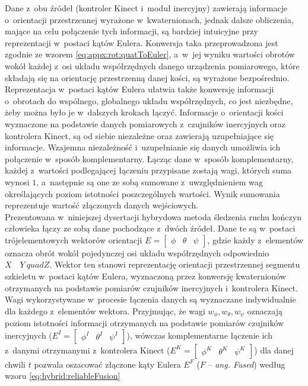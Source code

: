 Dane z~obu źródeł (kontroler Kinect i~moduł inercyjny) zawierają informacje o~orientacji przestrzennej wyrażone w~kwaternionach, jednak dalsze obliczenia, mające na celu połączenie tych informacji, są bardziej intuicyjne przy reprezentacji w~postaci kątów Eulera. Konwersja taka przeprowadzona jest zgodnie ze wzorem \ref{eq:appx:rot:quatToEuler}, a~w~jej wyniku wartości obrotów wokół każdej z~osi układu współrzędnych danego urządzenia pomiarowego, które składają się na orientację przestrzenną danej kości, są wyrażone bezpośrednio. Reprezentacja w~postaci kątów Eulera ułatwia także konwersję informacji o~obrotach do wspólnego, globalnego układu współrzędnych, co jest niezbędne, żeby można było je w~dalszych krokach łączyć. Informacje o~orientacji kości wyznaczone na podstawie danych pomiarowych z~czujników inercyjnych oraz kontrolera Kinect, są od siebie niezależne oraz zawierają uzupełniające się informacje. Wzajemna niezależność i~uzupełnianie się danych umożliwia ich połączenie w~sposób komplementarny. Łącząc dane w~sposób komplementarny, każdej z~wartości podlegającej łączeniu przypisane zostają wagi, których suma wynosi $1$, a~następnie są one ze sobą sumowane z~uwzględnieniem wag określających poziom istotności poszczególnych wartości. Wynik sumowania reprezentuje wartość złączonych danych wejściowych. \\
										
Prezentowana w~niniejszej dysertacji hybrydowa metoda śledzenia ruchu kończyn człowieka łączy ze sobą dane pochodzące z~dwóch źródeł. Dane te są w~postaci trójelementowych wektorów orientacji $E = \begin{bmatrix} \phi &  \theta & \psi \end{bmatrix}$, gdzie każdy z~elementów oznacza obrót wokół pojedynczej osi układu współrzędnych odpowiednio $X \quad Y\ quad Z$. Wektor ten stanowi reprezentację orientacji przestrzennej segmentu szkieletu w~postaci kątów Eulera, wyznaczoną przez konwersję kwaternionów otrzymanych na podstawie pomiarów czujników inercyjnych i~kontrolera Kinect. Wagi wykorzystywane w~procesie łączenia danych są wyznaczane indywidualnie dla każdego z~elementów wektora. Przyjmując, że wagi $w_\phi , w_\theta , w_\psi$ oznaczają poziom istotności informacji otrzymanych na podstawie pomiarów czujników inercyjnych ($E^I = \begin{bmatrix}  \phi^I &  \theta^I &  \psi^I \end{bmatrix}$), wówczas komplementarne łączenie ich z~danymi otrzymanymi z~kontrolera Kinect ($E^K = \begin{bmatrix}  \phi^K &  \theta^K &  \psi^K \end{bmatrix}$) dla danej chwili $t$ pozwala oszacować złączone kąty Eulera $E^F$ ($F$ -- \emph{ang. Fused}) według wzoru \ref{eq:hybrid:reliableFusion}
										
